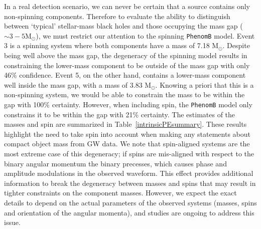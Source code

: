 \documentclass[12pt]{iopart}
\newcommand{\imr}{\texttt{PhenomB}\xspace}
\newcommand{\msun}{\ensuremath{\mathrm{M}_\odot}}
\begin{document}
In a real detection scenario, we can never be certain that a source contains
only non-spinning components.  Therefore to evaluate the ability to distinguish
between `typical' stellar-mass black holes and those occupying the mass gap
($\sim 3 - 5 \msun$), we must restrict our attention to the spinning \imr
model.  Event 3 is a spinning system where both components have a mass of 7.18 
\msun.
Despite being well above the mass gap, the degeneracy of the spinning model
results in constraining the lower-mass component to be outside of the mass gap
with only 46\% confidence.  Event 5, on the other hand, contains a lower-mass
component well inside the mass gap, with a mass of 3.83 \msun.  Knowing a
priori that this is a non-spinning system, we would be able to constrain the
mass to be within the gap with 100\% certainty.  However, when including spin,
the \imr model only constrains it to be within the gap with 21\% certainty. The
estimates of the masses and spin are summarized in
Table~\ref{intrinsicPEsummary}.  These results highlight the need to take spin
into account when making any statements about compact object mass from GW data.
We note that spin-aligned systems are the most extreme case of this degeneracy;
if spins are mis-aligned with respect to the binary angular momentum the binary
precesses, which causes phase and amplitude modulations in the observed
waveform. This effect provides additional information to break the degeneracy
between masses and spins that may result in tighter constraints on the
component masses. However, we expect the exact details to depend on the actual
parameters of the observed systems (masses, spins and orientation of the
angular momenta), and studies are ongoing to address this issue.
\end{document}
